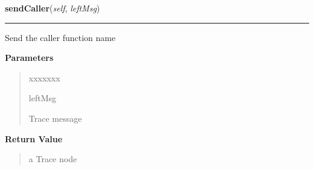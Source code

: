 \hspace{.8\funcindent}\begin{boxedminipage}{\funcwidth}

    \raggedright \textbf{sendCaller}(\textit{self}, \textit{leftMsg})

    \vspace{-1.5ex}

    \rule{\textwidth}{0.5\fboxrule}
\setlength{\parskip}{2ex}
    Send the caller function name

\setlength{\parskip}{1ex}
      \textbf{Parameters}
      \vspace{-1ex}

      \begin{quote}
        \begin{Ventry}{xxxxxxx}

          \item[leftMsg]

          Trace message

        \end{Ventry}

      \end{quote}

      \textbf{Return Value}
    \vspace{-1ex}

      \begin{quote}
      a Trace node

      \end{quote}

    \end{boxedminipage}

    \label{tracetool:TraceToSend:sendDump}

    \vspace{0.5ex}

